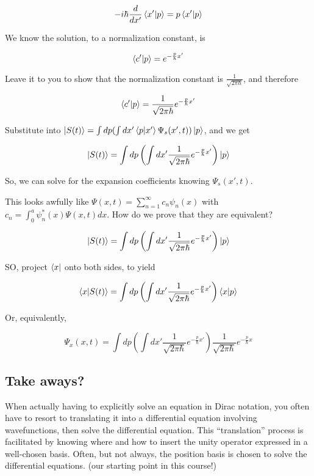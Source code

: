 \documentclass{article}
\begin{document}
$$-i \hbar \frac{d}{dx'} \braket{x'|p} = p \braket{x'|p}$$

We know the solution, to a normalization constant, is

$$\braket{c'|p} = e^{- \frac{p}{\hbar} x'}$$

Leave it to you to show that the normalization constant is $\frac{1}{\sqrt{2 \pi \hbar}}$, and therefore 

$$\braket{c'|p} = \frac{1}{\sqrt{2 \pi \hbar}} e^{- \frac{p}{\hbar} x'}$$

Substitute into $\ket{S(t)} = \int dp ( \int dx' \braket{p|x'} \Psi_s(x',t)) \ket{p}$, and we get

$$\ket{S(t)} = \int dp \left( \int dx' \frac{1}{\sqrt{2 \pi \hbar}} e^{- \frac{p}{\hbar} x'} \right) \ket{p}$$

So, we can solve for the expansion coefficients knowing $\Psi_s(x',t)$. 

This looks awfully like $\Psi(x,t) = \sum_{n=1}^\infty c_n \psi_n(x)$ with $c_n = \int_0^a \psi_n^*(x) \Psi(x,t) dx$. How do we prove that they are equivalent?


$$\ket{S(t)} = \int dp \left( \int dx' \frac{1}{\sqrt{2 \pi \hbar}} e^{- \frac{p}{\hbar} x'} \right) \ket{p}$$

SO, project $\bra{x}$ onto both sides, to yield

$$\braket{x|S(t)} = \int dp \left( \int dx' \frac{1}{\sqrt{2 \pi \hbar}} e^{- \frac{p}{\hbar} x'} \right) \braket{x|p}$$

Or, equivalently, 

$$\Psi_x(x,t) = \int dp \left( \int dx' \frac{1}{\sqrt{2 \pi \hbar}} e^{- \frac{p}{\hbar} x'} \right) \frac{1}{\sqrt{2 \pi \hbar}} e^{- \frac{p}{\hbar} x}$$

\subsection{Take aways?}


When actually having to explicitly solve an equation in Dirac notation, you often have to resort to translating it into a differential equation involving wavefunctions, then solve the differential equation. This “translation” process is facilitated by knowing where and how to insert the unity operator expressed in a well-chosen basis. Often, but not always, the position basis is chosen to solve the differential equations. (our starting point in this course!)
\end{document}
